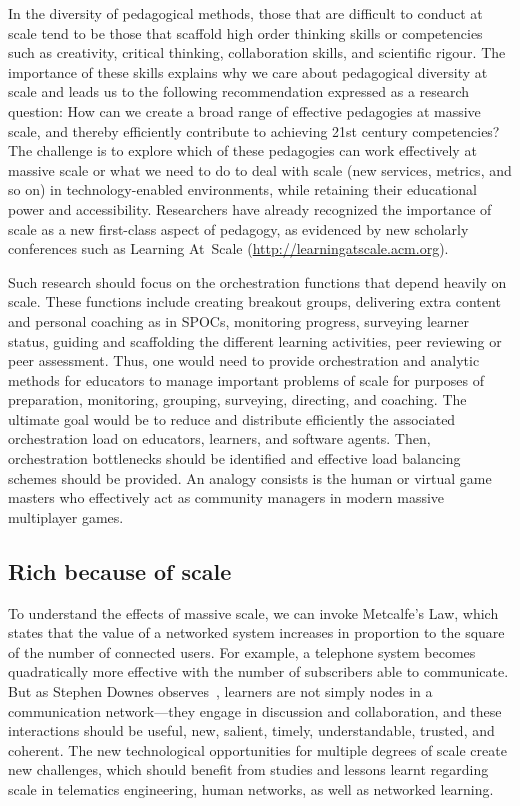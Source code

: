 In the diversity of pedagogical methods, those that are difficult to conduct
at scale tend to be those that scaffold high order thinking skills or
competencies such as creativity, critical thinking, collaboration
skills, and scientific rigour.  The importance of these skills explains
why we care about pedagogical diversity at scale and leads us to the
following recommendation expressed as a research question: How can we
create a broad range of effective pedagogies at massive scale, and
thereby efficiently contribute to achieving 21st century competencies? The
challenge is to explore which of these pedagogies can work effectively
at massive scale or what we need to do to deal with scale (new services,
metrics, and so on) in technology-enabled environments, while retaining their
educational power and accessibility.  Researchers have already
recognized the importance of scale as a new first-class aspect of
pedagogy, as evidenced by new scholarly conferences such as Learning
At~Scale (\url{http://learningatscale.acm.org}).

Such research should focus on the orchestration functions that depend heavily
on scale. These functions include creating breakout groups, delivering
extra content and personal coaching as in SPOCs, monitoring progress,
surveying learner status, guiding and scaffolding the different learning
activities, peer reviewing or peer assessment. Thus, one would need to
provide orchestration and analytic methods for educators to manage
important problems of scale for purposes of preparation, monitoring,
grouping, surveying, directing, and coaching. The ultimate goal would be
to reduce and distribute efficiently the associated orchestration load
on educators, learners, and software agents. Then, orchestration
bottlenecks should be identified and effective load balancing schemes
should be provided. An analogy consists is 
the human or virtual game masters who effectively act as community
managers in modern 
massive multiplayer games.

\subsection{Rich because of scale}

To understand the effects of massive scale, we can invoke
Metcalfe's Law, which states that the value of a networked system
increases in proportion to the square of the number of connected users.
For example, a telephone system becomes quadratically more 
effective with the number of subscribers able to communicate. But as
Stephen Downes observes~\cite{downes-personal-network-effect-2007},
learners are not simply nodes in a communication network---they engage
in discussion and collaboration, and these interactions should be
useful, new, salient, timely, understandable, trusted, and coherent. The
new technological opportunities for multiple degrees of scale create new
challenges, which should benefit from studies and lessons learnt
regarding scale in telematics engineering, human networks, as well as
networked learning.

